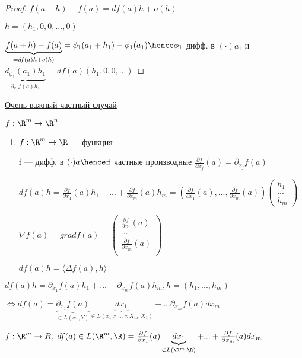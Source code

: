 \begin{proof}
    $f(a + h) - f(a) = df(a)h + o(h)$ 

    $h = (h_1, 0, 0, ..., 0)$

    $\underbrace{f(a + h) - f(a)}_{ = df(a)h + o(h)} = \phi_1(a_1 + h_1) - \phi_1(a_1) \hence \phi_1$ дифф. в $(\cdot) a_1$ и 
    $\underbrace{d_{\phi_1}(a_1)h_1}_{\partial_{x_1} f(a)h_1} = df(a)(h_1, 0, 0, ...)$  
\end{proof}

\underline{Очень важный частный случай}

$f : \R ^ m \to \R^n$

\begin{enumerate}
    

    \item $f : \R ^ m \to \R$ --- функция
    
    f --- дифф. в $(\cdot)a \hence \exists $ частные производные $\frac{\partial f}{\partial {x_j}}(a) = \partial _{x_j}f(a)$

    $df(a)h = \frac{\partial f}{\partial x_1}(a)h_1 + ... + \frac{\partial f}{\partial x_m}(a)h_m = \left( \frac{\partial f}{\partial x_1}(a), ... , \frac{\partial f}{\partial x_m}(a)\right) \begin{pmatrix}
        h_1\\
        ...\\
        h_m
    \end{pmatrix}$

    \begin{definition}
        $ \nabla f(a) = grad f(a) = \begin{pmatrix}
            \frac{\partial f}{\partial x_1}(a)\\
            ...\\
            \frac{\partial f}{\partial x_m}(a)\\
        \end{pmatrix}$

        $df(a)h = \langle \Delta f(a), h \rangle$
    \end{definition}
\end{enumerate}


\begin{remark}
    $df(a)h = \partial_{x_1}f(a)h_1 + ... + \partial_{x_m}f(a)h_m, h = (h_1, ..., h_m)$ 
    
    $\Longleftrightarrow df(a) = \underbrace{\partial_{x_1}f(a)}_{\in L(x_1, Y)} \underbrace{dx_1}_{\in L(x_1 \times ... \times X_m, X_1)} + ... \partial_{x_m}f(a)dx_m$
    
    $f : \R^ m \to R$, $df(a) \in L(\R ^ m, \R) = \frac{\partial f}{\partial x_1}(a) \underbrace{dx_1}_{\in L(\R^m, \R)} + ... + \frac{\partial f}{\partial x_m}(a) dx_m$
\end{remark}

